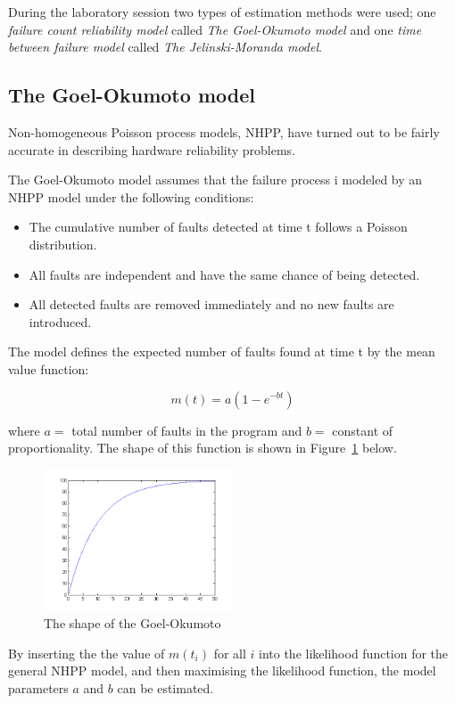 During the laboratory session two types of estimation methods were used; one \textit{failure count reliability model} called \textit{The Goel-Okumoto model }and one \textit{time between failure model} called \textit{The Jelinski-Moranda model}. 

\subsection{The Goel-Okumoto model}
Non-homogeneous Poisson process models, NHPP, have turned out to be fairly accurate in describing hardware reliability problems. 

The Goel-Okumoto model assumes that the failure process i modeled by an NHPP model under the following conditions:
\begin{itemize}
\item	The cumulative number of faults detected at time t follows a Poisson distribution.
\item	All faults are independent and have the same chance of being detected.
\item 	All detected faults are removed immediately and no new faults are introduced.
\end{itemize}

\noindent The model defines the expected number of faults found at time t by the mean value function:

$$m(t) = a(1 - e^{-bt})$$

\noindent where $a=$ total number of faults in the program and $b=$ constant of proportionality. The shape of this function is shown in Figure~\ref{goelokumoto} below.

\begin{figure}[htb!]
\centering
	\includegraphics[width=0.5\textwidth]{mshape.png}
\caption{The shape of the Goel-Okumoto  }
\label{goelokumoto}
\end{figure}

\noindent By inserting the the value of $m(t_{i})$ for all $i$ into the likelihood function for the general NHPP model, and then maximising the likelihood function, the model parameters $a$ and $b$ can be estimated. 

